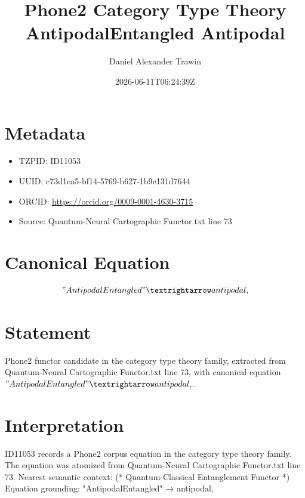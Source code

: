 \documentclass[11pt]{article}
\title{Phone2 Category Type Theory AntipodalEntangled Antipodal}
\author{Daniel Alexander Trawin}
\date{2026-06-11T06:24:39Z}
\begin{document}
\maketitle
\section*{Metadata}
\begin{itemize}
\item TZPID: ID11053
\item UUID: c73d1ea5-bf14-5769-b627-1b9e131d7644
\item ORCID: \url{https://orcid.org/0009-0001-4630-3715}
\item Source: Quantum-Neural Cartographic Functor.txt line 73
\end{itemize}
\section*{Canonical Equation}
\[
"AntipodalEntangled" → antipodal,
\]
\section*{Statement}
Phone2 functor candidate in the category type theory family, extracted from Quantum-Neural Cartographic Functor.txt line 73, with canonical equation $"AntipodalEntangled" → antipodal,$.
\section*{Interpretation}
ID11053 records a Phone2 corpus equation in the category type theory family. The equation was atomized from Quantum-Neural Cartographic Functor.txt line 73. Nearest semantic context: (* Quantum-Classical Entanglement Functor *) Equation grounding: "AntipodalEntangled" → antipodal,
\end{document}
